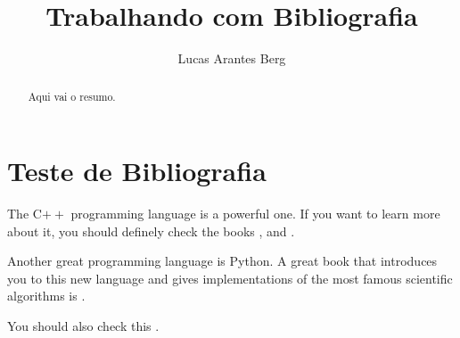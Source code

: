 \documentclass[]{article}
\title{Trabalhando com Bibliografia}
\author{Lucas Arantes Berg}
\begin{document}
\maketitle

\begin{abstract}
	Aqui vai o resumo.
\end{abstract}

\section{Teste de Bibliografia}

The C$++$ programming language is a powerful one. If you want to learn more about it, you should definely check the books \cite{stroustrup2013c++}, \cite{stroustrup2014programming} and \cite{oualline2002practical}.

Another great programming language is Python. A great book that introduces you to this new language and gives implementations of the most famous scientific algorithms is \cite{langtangen2016primer}.

You should also check this \cite{torres2017vii}.



\end{document}
